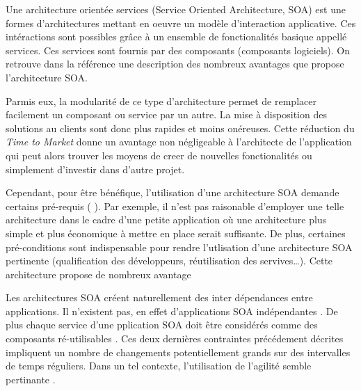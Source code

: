\documentclass[11pt,a4paper,utf8x]{article}
\begin{document}
Une architecture orientée services (Service Oriented Architecture, SOA) est une formes d'architectures mettant en oeuvre un modèle d'interaction applicative. Ces intéractions sont possibles grâce à un ensemble de fonctionalités basique appellé services. Ces services sont fournis par des composants (composants logiciels). On retrouve dans la référence \cite{soa} une description des nombreux avantages que propose l'architecture SOA.


Parmis eux, la modularité de ce type d'architecture permet de remplacer facilement un composant ou service par un autre. La mise à disposition des solutions au clients sont donc plus rapides et moins onéreuses. Cette réduction du \emph{Time to Market} donne un avantage non négligeable à l'architecte de l'application qui peut alors trouver les moyens de creer de nouvelles fonctionalités ou simplement d'investir dans d'autre projet.


Cependant, pour être bénéfique,  l'utilisation d'une architecture SOA demande certains pré-requis (\cf{} \cite{soa}). Par exemple, il n'est pas raisonable d'employer une telle architecture dans le cadre d'une petite application où une architecture plus simple et plus économique à mettre en place serait suffisante. De plus, certaines pré-conditions sont indispensable pour rendre l'utlisation d'une architecture SOA pertinente (qualification des développeurs, réutilisation des servives\dots).
Cette architecture propose de nombreux avantage



Les architectures SOA créent naturellement des inter dépendances entre applications. Il n'existent pas, en effet d'applications SOA \og{} indépendantes \fg{}. De plus chaque service d'une pplication SOA doit être considérés comme des composants \og ré-utilisables \fg{}. Ces deux dernières contraintes précédement décrites impliquent un nombre de changements potentiellement grands sur des intervalles de temps réguliers. Dans un tel contexte, l'utilisation de l'agilité semble pertinante \cite{ibm}.  





% 
%
% 
% 
% 


% 


\end{document}
